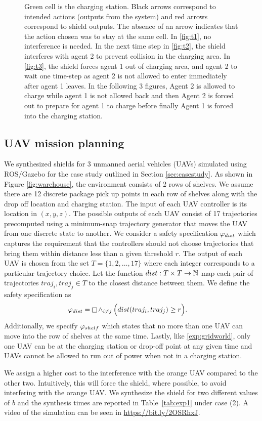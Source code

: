 \begin{figure}[h]
	
	\caption[Gridworld simulaiton of multi-agent shielding interference]{Green cell is the charging station. Black arrows correspond to intended actions (outputs from the system) and red arrows correspond to shield outputs. The absence of an arrow indicates that the action chosen was to stay at the same cell. In \ref{fig:t1}, no interference is needed. In the next time step in \ref{fig:t2}, the shield interferes with agent 2 to prevent collision in the charging area. In \ref{fig:t3}, the shield forces agent 1 out of charging area, and agent 2 to wait one time-step as agent 2 is not allowed to enter immediately after agent 1 leaves. In the following 3 figures, Agent 2 is allowed to charge while agent 1 is not allowed back and then Agent 2 is forced out to prepare for agent 1 to charge before finally Agent 1 is forced into the charging station. }
	\label{fig:casestudies}
\end{figure}


\subsection{UAV mission planning}\label{sec:results_casestudy}
We synthesized shields for 3 unmanned aerial vehicles (UAVs) simulated using ROS/Gazebo for the case study outlined in Section \ref{sec:casestudy}. As shown in Figure \ref{fig:warehouse}, the environment consists of 2 rows of shelves. We assume there are 12 discrete package pick up points in each row of shelves along with the drop off location and charging station. The input of each UAV controller is its location in $(x,y,z)$. The possible outputs of each UAV consist of 17 trajectories precomputed using a minimum-snap trajectory generator that moves the UAV from one discrete state to another.
We consider a safety specification $\varphi_{dist}$ which captures the requirement that the controllers should not choose trajectories that bring them within distance less than a given threshold $r$. The output of each UAV is chosen from the set $T = \{1,2,\ldots,17\}$ where each integer corresponds to a particular trajectory choice. Let the function $dist: T \times T \to \mathbb{N}$  map each pair of trajectories $traj_i,traj_j \in T$ to the closest distance between them. 
We define the safety specification as
  \begin{align}
  \spec_{dist}&= \LTLglobally \LTLand_{i\neq j}\Big(dist(traj_i,traj_j) \geq r\Big).
  \end{align}
 Additionally, we specify $\varphi_{shelf}$ which states that no more than one UAV can move into the row of shelves at the same time. Lastly, like \ref{exp:gridworld}, only one UAV can be at the charging station or drop-off point at any given time and UAVs cannot be allowed to run out of power when not in a charging station. 

We assign a higher cost to the interference with the orange UAV compared to the other two. Intuitively, this will force the shield, where possible, to avoid interfering with the orange UAV. We synthesize the shield for two different values of $b$ and the synthesis times are reported in Table~\ref{tab:exp1} under case (2). A video of the simulation can be seen in \url{https://bit.ly/2OSRhxJ}.

